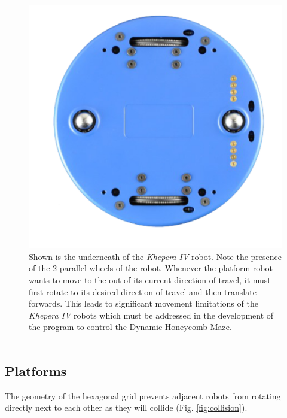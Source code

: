 \begin{figure}[h]
    \centering
    \includegraphics[scale = 0.5]{images/khepera_IV_robot.png}
    \caption{Shown is the underneath of the \textit{Khepera IV} robot. Note the presence of the 2 parallel wheels of the robot. 
    Whenever the platform robot wants to move to the out of its current direction of travel, it must first rotate to its desired direction of travel and then translate forwards.
    This leads to significant movement limitations of the \textit{Khepera IV} robots which must be addressed in the development of the program to control the Dynamic Honeycomb Maze. \\ \\
    }
    \label{fig:robot}
\end{figure}

\subsection{Platforms}


The geometry of the hexagonal grid prevents adjacent robots from rotating directly next to each other as they will collide (Fig. \ref{fig:collision}).

